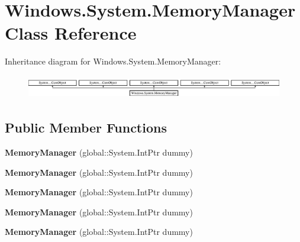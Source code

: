 \hypertarget{class_windows_1_1_system_1_1_memory_manager}{}\section{Windows.\+System.\+Memory\+Manager Class Reference}
\label{class_windows_1_1_system_1_1_memory_manager}
Inheritance diagram for Windows.\+System.\+Memory\+Manager\+:\begin{figure}[H]
\begin{center}
\leavevmode
\includegraphics[height=1.041860cm]{class_windows_1_1_system_1_1_memory_manager}
\end{center}
\end{figure}
\subsection*{Public Member Functions}
\begin{DoxyCompactItemize}
\item 
\mbox{\label{class_windows_1_1_system_1_1_memory_manager_a33e3d3e93fe2e6e7a5e6b691ef322e79}} 
{\bfseries Memory\+Manager} (global\+::\+System.\+Int\+Ptr dummy)
\item 
\mbox{\label{class_windows_1_1_system_1_1_memory_manager_a33e3d3e93fe2e6e7a5e6b691ef322e79}} 
{\bfseries Memory\+Manager} (global\+::\+System.\+Int\+Ptr dummy)
\item 
\mbox{\label{class_windows_1_1_system_1_1_memory_manager_a33e3d3e93fe2e6e7a5e6b691ef322e79}} 
{\bfseries Memory\+Manager} (global\+::\+System.\+Int\+Ptr dummy)
\item 
\mbox{\label{class_windows_1_1_system_1_1_memory_manager_a33e3d3e93fe2e6e7a5e6b691ef322e79}} 
{\bfseries Memory\+Manager} (global\+::\+System.\+Int\+Ptr dummy)
\item 
\mbox{\label{class_windows_1_1_system_1_1_memory_manager_a33e3d3e93fe2e6e7a5e6b691ef322e79}} 
{\bfseries Memory\+Manager} (global\+::\+System.\+Int\+Ptr dummy)
\end{DoxyCompactItemize}
